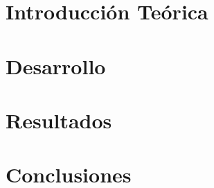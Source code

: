 \documentclass[11pt,a4paper]{article}
\begin{document}
\maketitle

\tableofcontents

\newpage


\section{Introducción Te\'orica}



\section{Desarrollo}



\section{Resultados}



\section{Conclusiones}


\newpage


\newpage


\end{document}
